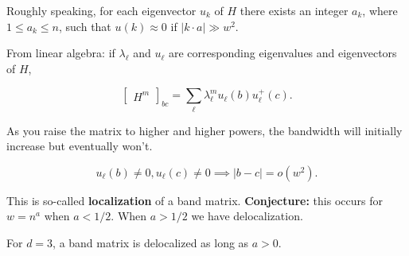 Roughly speaking, for each eigenvector \(u_k\) of \(H\) there exists an integer \(a_k\), where \(1 \leq a_k \leq n\), such that \(u(k) \approx 0\) if \(|k \cdot a| \gg w^2\).

From linear algebra: if \(\lambda_\ell\) and \(u_\ell\) are corresponding eigenvalues and eigenvectors of \(H\),

\[
\begin{bmatrix} H^m \end{bmatrix}_{bc} = \sum_\ell \lambda_\ell^m u_\ell(b) u_\ell^+(c). 
\]

As you raise the matrix to higher and higher powers, the bandwidth will initially increase but eventually won't.


\[
u_\ell(b) \neq 0, u_\ell(c) \neq 0 \implies |b-c| = o(w^2).
\]

This is so-called \textbf{localization} of a band matrix. \textbf{Conjecture:} this occurs for \(w = n^a\) when \(a < 1/2\). When \(a > 1/2\) we have delocalization. 

For \(d=3\), a band matrix is delocalized as long as \(a > 0\). 

